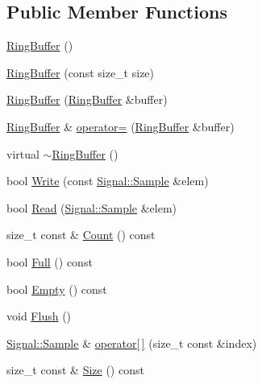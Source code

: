 \subsection*{Public Member Functions}
\begin{DoxyCompactItemize}
\item 
\hyperlink{class_signal_1_1_ring_buffer_a66b2a49fc1ea8d4e2d529362452a9e5e}{Ring\+Buffer} ()
\item 
\hyperlink{class_signal_1_1_ring_buffer_aab0efff6a85c76ce9063b6a7dcc1fe97}{Ring\+Buffer} (const size\+\_\+t size)
\item 
\hyperlink{class_signal_1_1_ring_buffer_a9823e69bede828ca41cdf0b8372224f7}{Ring\+Buffer} (\hyperlink{class_signal_1_1_ring_buffer}{Ring\+Buffer} \&buffer)
\item 
\hyperlink{class_signal_1_1_ring_buffer}{Ring\+Buffer} \& \hyperlink{class_signal_1_1_ring_buffer_a2bc19d3eb407be62e36ac327bffe4b2f}{operator=} (\hyperlink{class_signal_1_1_ring_buffer}{Ring\+Buffer} \&buffer)
\item 
virtual \hyperlink{class_signal_1_1_ring_buffer_aff2a78175f358585ddf207f470062d3e}{$\sim$\+Ring\+Buffer} ()
\item 
bool \hyperlink{class_signal_1_1_ring_buffer_aa291195b777aa50aa7a61ab1f4954bce}{Write} (const \hyperlink{class_signal_1_1_sample}{Signal\+::\+Sample} \&elem)
\item 
bool \hyperlink{class_signal_1_1_ring_buffer_a9a5c8429c0e422e3d4763adb78b0a87c}{Read} (\hyperlink{class_signal_1_1_sample}{Signal\+::\+Sample} \&elem)
\item 
size\+\_\+t const \& \hyperlink{class_signal_1_1_ring_buffer_acf6e81f09bb9f10a79ced6da84e78e20}{Count} () const 
\item 
bool \hyperlink{class_signal_1_1_ring_buffer_ac8124016cfc0c833a3565c87d5f6f1e5}{Full} () const 
\item 
bool \hyperlink{class_signal_1_1_ring_buffer_a73416d725604567d4b496f9821bc0c04}{Empty} () const 
\item 
void \hyperlink{class_signal_1_1_ring_buffer_aa9d2938e5c11c5d3c058db9b7e310406}{Flush} ()
\item 
\hyperlink{class_signal_1_1_sample}{Signal\+::\+Sample} \& \hyperlink{class_signal_1_1_buffer_a0b4ced776c42720b214f6054fa21547a}{operator\mbox{[}$\,$\mbox{]}} (size\+\_\+t const \&index)
\item 
size\+\_\+t const \& \hyperlink{class_signal_1_1_buffer_ad0350078d641ed5cb15a9401d9d20ffe}{Size} () const 
\end{DoxyCompactItemize}
